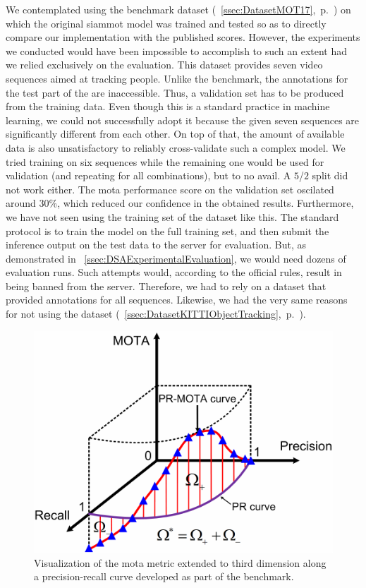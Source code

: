 We contemplated using the \motseventeen{} benchmark dataset (\sectiontext{}~\ref{ssec:DatasetMOT17},~p.~\pageref{ssec:DatasetMOT17}) on which the original \gls{siammot} model was trained and tested so as to directly compare our implementation with the published scores. However, the experiments we conducted would have been impossible to accomplish to such an extent had we relied exclusively on the \motseventeen{} evaluation. This dataset provides seven video sequences aimed at tracking people. Unlike the \uadetrac{} benchmark, the annotations for the test part of the \motseventeen{} are inaccessible. Thus, a validation set has to be produced from the training data. Even though this is a standard practice in machine learning, we could not successfully adopt it because the given seven sequences are significantly different from each other. On top of that, the amount of available data is also unsatisfactory to reliably cross-validate such a complex model. We tried training on six sequences while the remaining one would be used for validation (and repeating for all combinations), but to no avail. A $5$/$2$ split did not work either. The \gls{mota} performance score on the validation set oscilated around $30$\%, which reduced our confidence in the obtained results. Furthermore, we have not seen using the training set of the \motseventeen{} dataset like this. The standard protocol is to train the model on the full training set, and then submit the inference output on the test data to the server for evaluation. But, as demonstrated in \sectiontext{}~\ref{ssec:DSAExperimentalEvaluation}, we would need dozens of evaluation runs. Such attempts would, according to the official rules, result in being banned from the server. Therefore, we had to rely on a dataset that provided annotations for all sequences. Likewise, we had the very same reasons for not using the \kitti{} dataset (\sectiontext{}~\ref{ssec:DatasetKITTIObjectTracking},~p.~\pageref{ssec:DatasetKITTIObjectTracking}).

\begin{figure}[t]
    \centerline{\includegraphics[width=0.5\linewidth]{figures/siamese_tracking/pr_mota_curve.pdf}}
    \caption[Visualization of \gls{mota} along a precision-recall curve]{Visualization of the \gls{mota} metric extended to third dimension along a precision-recall curve developed as part of the \uadetrac{} benchmark. }
    \label{fig:PRMOTAVisualization}
\end{figure}


